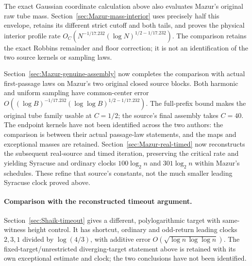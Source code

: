 The exact Gaussian coordinate calculation above also evaluates Mazur's
original raw tube mass. Section~\ref{sec:Mazur-mass-interior} uses precisely
half this envelope, retains its different strict cutoff and both tails,
and proves the physical interior profile rate
$O_C(N^{-1/17.232}(\log N)^{1/2-1/17.232})$.
The comparison retains the exact Robbins remainder and floor correction;
it is not an identification of the two source kernels or sampling laws.

Section~\ref{sec:Mazur-genuine-assembly} now completes the comparison
with actual first-passage laws on Mazur's two original closed source
blocks. Both harmonic and uniform sampling have common-center error
$O((\log B)^{-1/17.232}(\log\log B)^{1/2-1/17.232})$.
The full-prefix bound makes the original tube family usable at $C=1/2$;
the source's final assembly takes $C=40$. The endpoint kernels have not
been identified across the two authors: the comparison is between
their actual passage-law statements, and the maps and exceptional
masses are retained. Section~\ref{sec:Mazur-real-timed} now reconstructs
the subsequent real-source and timed iteration, preserving the critical
rate and yielding Syracuse and ordinary clocks $100\log_2 n$ and
$301\log_2 n$ within Mazur's schedules. These refine that source's
constants, not the much smaller leading Syracuse clock proved above.

\paragraph{Comparison with the reconstructed timeout argument.}
Section~\ref{sec:Shaik-timeout} gives a different, polylogarithmic target
with same-witness height control. It has shortcut, ordinary and
odd-return leading clocks \(2,3,1\) divided by \(\log(4/3)\), with
additive error \(O(\sqrt{\log n\,\log\log n})\).
The fixed-target/unrestricted diverging-target statement above is
retained with its own exceptional estimate and clock; the two
conclusions have not been identified.
